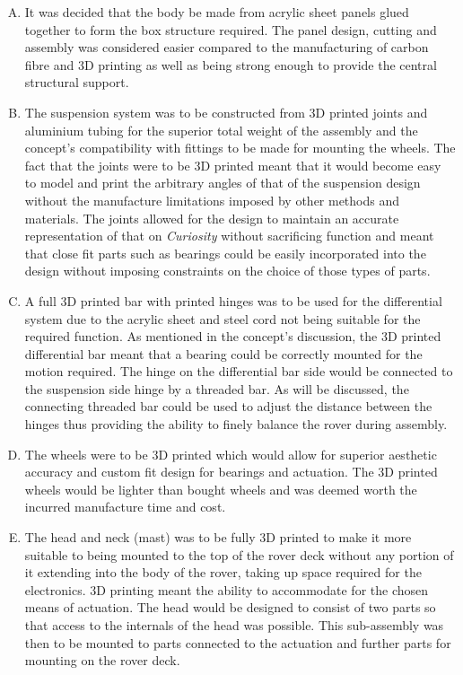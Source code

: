     \begin{enumerate}[A.]
      \item It was decided that the body be made from acrylic sheet panels glued together to form the box structure required. The panel design, cutting and assembly was considered easier compared to the manufacturing of carbon fibre and 3D printing as well as being strong enough to provide the central structural support.
      \item The suspension system was to be constructed from 3D printed joints and aluminium tubing for the superior total weight of the assembly and the concept's compatibility with fittings to be made for mounting the wheels. The fact that the joints were to be 3D printed meant that it would become easy to model and print the arbitrary angles of that of the suspension design without the manufacture limitations imposed by other methods and materials. The joints allowed for the design to maintain an accurate representation of that on \textit{Curiosity} without sacrificing function and meant that close fit parts such as bearings could be easily incorporated into the design without imposing constraints on the choice of those types of parts.
      \item A full 3D printed bar with printed hinges was to be used for the differential system due to the acrylic sheet and steel cord not being suitable for the required function. As mentioned in the concept's discussion, the 3D printed differential bar meant that a bearing could be correctly mounted for the motion required. The hinge on the differential bar side would be connected to the suspension side hinge by a threaded bar. As will be discussed, the connecting threaded bar could be used to adjust the distance between the hinges thus providing the ability to finely balance the rover during assembly.
      \item The wheels were to be 3D printed which would allow for superior aesthetic accuracy and custom fit design for bearings and actuation. The 3D printed wheels would be lighter than bought wheels and was deemed worth the incurred manufacture time and cost.
      \item The head and neck (mast) was to be fully 3D printed to make it more suitable to being mounted to the top of the rover deck without any portion of it extending into the body of the rover, taking up space required for the electronics. 3D printing meant the ability to accommodate for the chosen means of actuation. The head would be designed to consist of two parts so that access to the internals of the head was possible. This sub-assembly was then to be mounted to parts connected to the actuation and further parts for mounting on the rover deck.

\end{enumerate}

